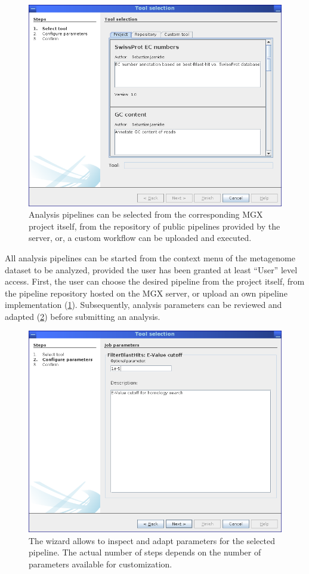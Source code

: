 \begin{figure}[H]
\centering
\includegraphics[width=.8\textwidth]{img/mgx/analysiswiz1}
\caption[Analysis selection]{Analysis pipelines can be selected from the corresponding
MGX project itself, from the repository of public pipelines provided by the server, or,
a custom workflow can be uploaded and executed.}
\label{anawiz1}
\end{figure}

All analysis pipelines can be started from the context menu of the metagenome dataset to be analyzed, provided
the user has been granted at least ``User'' level access. First,
the user can choose the desired pipeline from the project itself, from the pipeline repository hosted on the
MGX server, or upload an own pipeline implementation (\ref{anawiz1}). Subsequently, analysis parameters
can be reviewed and adapted (\ref{anawiz2}) before submitting an analysis.

\begin{figure}[H]
\centering
\includegraphics[width=.8\textwidth]{img/mgx/analysiswiz2}
\caption[Analysis parameters]{The wizard allows to inspect and adapt parameters for the selected pipeline. The actual
number of steps depends on the number of parameters available for customization.}
\label{anawiz2}
\end{figure}

